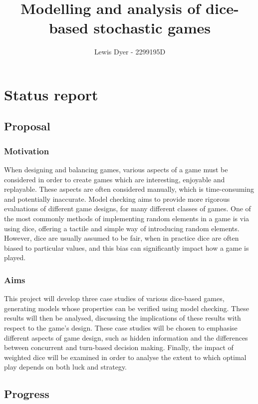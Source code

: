 \documentclass[11pt]{article}
\title{Modelling and analysis of dice-based stochastic games}
\author{ Lewis Dyer - 2299195D }
\begin{document}
    \maketitle
    
    
     

\section{Status report}

\subsection{Proposal}\label{proposal}

\subsubsection{Motivation}\label{motivation}

When designing and balancing games, various aspects of a game must be considered in order to create games which are interesting, enjoyable and replayable. These aspects are often considered manually, which is time-consuming and potentially inaccurate. Model checking aims to provide more rigorous evaluations of different game designs, for many different classes of games.
One of the most commonly methods of implementing random elements in a game is via using dice, offering a tactile and simple way of introducing random elements. However, dice are usually assumed to be fair, when in practice dice are often biased to particular values, and this bias can significantly impact how a game is played.

\subsubsection{Aims}\label{aims}

This project will develop three case studies of various dice-based games, generating models whose properties can be verified using model checking. These results will then be analysed, discussing the implications of these results with respect to the game's design. These case studies will be chosen to emphasise different aspects of game design, such as hidden information and the differences between concurrent and turn-based decision making. Finally, the impact of weighted dice will be examined in order to analyse the extent to which optimal play depends on both luck and strategy.

\subsection{Progress}\label{progress}
\end{document}
